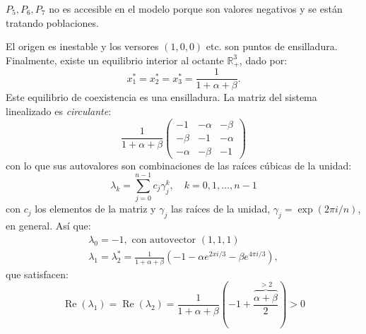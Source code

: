 \documentclass[twocolumn,aps,prl]{revtex4-1}
\newcommand{\talf}{\frac{\alpha - 1}{\alpha \beta - 1} }
\newcommand{\tbet}{\frac{\beta  - 1}{\alpha \beta - 1} }
\begin{document}



$P_5, P_6, P_7$ no es accesible en el modelo porque son valores negativos y se están tratando poblaciones.

El origen es inestable y los versores $(1,0,0)$ etc. son puntos de ensilladura. 
Finalmente, existe un equilibrio interior al octante $\mathbb{R}_{+}^{3}$, dado por:
$$
x_{1}^{*}=x_{2}^{*}=x_{3}^{*}=\frac{1}{1+\alpha+\beta} .
$$
Este equilibrio de coexistencia es una ensilladura. La matriz del sistema linealizado es \textit{circulante}:
$$
\frac{1}{1+\alpha+\beta}\left(\begin{array}{ccc}
-1 & -\alpha & -\beta \\
-\beta & -1 & -\alpha \\
-\alpha & -\beta & -1
\end{array}\right)
$$
con lo que sus autovalores son combinaciones de las raíces cúbicas de la unidad:
$$
\lambda_{k}=\sum_{j=0}^{n-1} c_{j} \gamma_{j}^{k}, \quad k=0,1, \ldots, n-1
$$
con $c_{j}$ los elementos de la matriz y $\gamma_{j}$ las raíces de la unidad, $\gamma_{j}=\exp (2 \pi i / n)$, en general. Así que:
$$
\begin{array}{c}
\lambda_{0}=-1, \text { con autovector }(1,1,1) \\
\lambda_{1}=\lambda_{2}^{*}=\frac{1}{1+\alpha+\beta}\left(-1-\alpha e^{2 x i / 3}-\beta e^{4 \pi i / 3}\right),
\end{array}
$$
que satisfacen:
$$
\operatorname{Re}\left(\lambda_{1}\right)=\operatorname{Re}\left(\lambda_{2}\right)=\frac{1}{1+\alpha+\beta}\left(-1+\frac{\overbrace{\alpha+\beta}^{>2}}{2}\right)>0
$$
\end{document}
